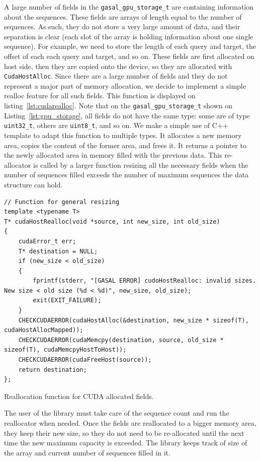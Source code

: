 A large number of fields in the \verb|gasal_gpu_storage_t| are containing information about the sequences. These fields are arrays of length equal to the number of sequences. As such, they do not store a very large amount of data, and their separation is clear (each slot of the array is holding information about one single sequence). For example, we need to store the length of each query and target, the offset of each each query and target, and so on. These fields are first allocated on host side, then they are copied onto the device, so they are allocated with \verb|CudaHostAlloc|. Since there are a large number of fields and they do not represent a major part of memory allocation, we decide to implement a simple realloc feature for all such fields. This function is displayed on listing~\ref{lst:cudarealloc}. Note that on the \verb|gasal_gpu_storage_t| shown on Listing~\ref{lst:gpu_storage}, all fields do not have the same type: some are of type \verb|uint32_t|, others are \verb|uint8_t|, and so on. We make a simple use of C++ template to adapt this function to multiple types. It allocates a new memory area, copies the content of the former area, and frees it. It returns a pointer to the newly allocated area in memory filled with the previous data. This re-allocator is called by a larger function resizing all the necessary fields when the number of sequences filled exceeds the number of maximum sequences the data structure can hold.

\begin{listing}[h!]
	\begin{verbatim}
// Function for general resizing
template <typename T>
T* cudaHostRealloc(void *source, int new_size, int old_size) 
{
	cudaError_t err;
	T* destination = NULL;
	if (new_size < old_size)
	{
		fprintf(stderr, "[GASAL ERROR] cudoHostRealloc: invalid sizes. New size < old size (%d < %d)", new_size, old_size);
		exit(EXIT_FAILURE);
	}
	CHECKCUDAERROR(cudaHostAlloc(&destination, new_size * sizeof(T), cudaHostAllocMapped));
	CHECKCUDAERROR(cudaMemcpy(destination, source, old_size * sizeof(T), cudaMemcpyHostToHost));
	CHECKCUDAERROR(cudaFreeHost(source));
	return destination;
};
	\end{verbatim}
	\caption{Reallocation function for CUDA allocated fields.}
	\label{lst:cudarealloc}
\end{listing}

The user of the library must take care of the sequence count and run the reallocator when needed. Once the fields are reallocated to a bigger memory area, they keep their new size, so they do not need to be re-allocated until the next time the new maximum capacity is exceeded. The library keeps track of size of the array and current number of sequences filled in it. 

